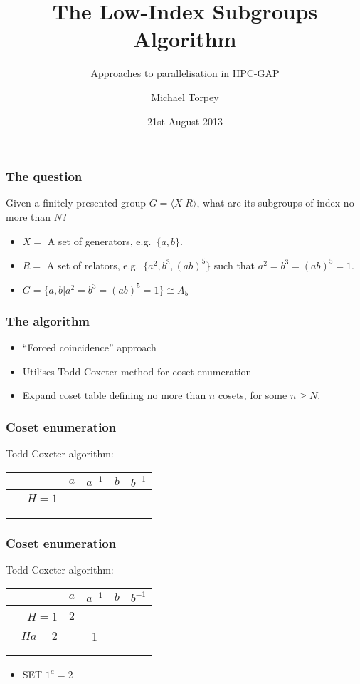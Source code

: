 \documentclass{beamer}
\title{The Low-Index Subgroups Algorithm}
\subtitle{Approaches to parallelisation in HPC-GAP}
\author{Michael Torpey}
\institute{University of St Andrews}
\date{21st August 2013}
\begin{document}
\maketitle

\begin{frame}
  \frametitle{The question}
  Given a finitely presented group $G = \langle X | R \rangle$, what are its subgroups of index no more than $N$?
  \begin{itemize}
  \item<2-> $X = $ A set of generators, e.g.~$\{a,b\}$.
  \item<3-> $R = $ A set of relators, e.g.~$\{a^2,b^3,(ab)^5\}$ such that $a^2=b^3=(ab)^5=1$.
  \item<4-> $G = \{a,b | a^2=b^3=(ab)^5=1\} \cong A_5$
  \end{itemize}
\end{frame}

\begin{frame}
  \frametitle{The algorithm}
  \begin{itemize}
  \item ``Forced coincidence'' approach
  \item Utilises Todd-Coxeter method for coset enumeration
  \item Expand coset table defining no more than $n$ cosets, for some $n \geq N$.
  \end{itemize}
\end{frame}

\begin{frame}[t]
  \frametitle{Coset enumeration}
  \pause
  Todd-Coxeter algorithm:
  \pause
  \begin{table}
    \begin{tabular}{r | c c c c}
      & $a$ & $a^{-1}$ & $b$ & $b^{-1}$ \\ \hline
      $\phantom{b^{-1}}H=1$ & & & \phantom{3} & \\ \\ \\ \\
    \end{tabular}
  \end{table}

\end{frame}

\begin{frame}[t]
  \frametitle{Coset enumeration}
  Todd-Coxeter algorithm:
  \begin{table}
    \begin{tabular}{r | c c c c}
      & $a$ & $a^{-1}$ & $b$ & $b^{-1}$ \\ \hline
      $\phantom{b^{-1}}H=1$ & 2 & & \phantom{3} & \\
      $Ha=2$ & & 1 & & \\ \\ \\
    \end{tabular}
  \end{table}

  \begin{itemize}
  \item SET $1^a=2$
  \end{itemize}
\end{frame}
\end{document}

